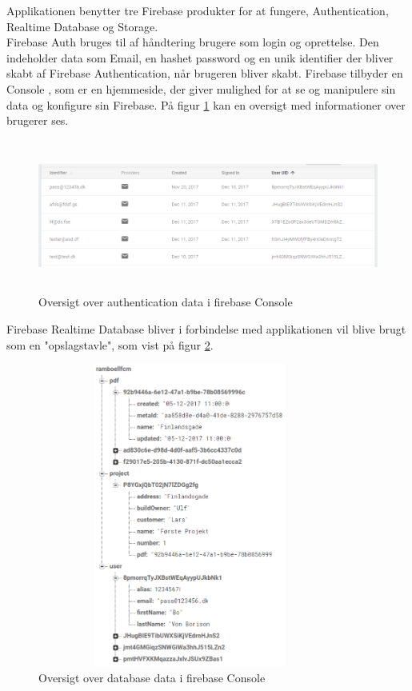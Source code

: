 Applikationen benytter tre Firebase produkter for at fungere, Authentication, Realtime Database og Storage.\\

 Firebase Auth\cite{FirebaseAuth} bruges til af håndtering brugere som login og oprettelse. Den indeholder data som Email, en hashet password og en unik identifier der bliver skabt af Firebase Authentication, når brugeren bliver skabt. Firebase tilbyder en Console , som er en hjemmeside, der giver mulighed for at se og manipulere sin data og konfigure sin Firebase. På figur \ref{fig:FirebaseAuthPNG} kan en oversigt med informationer over brugerer ses. 
\begin{figure}[H] %
	\centering
	\includegraphics[height=5cm, width=15cm]{../ArkitekturDesign/Design/Firebase/FirebaseAuth.PNG}
	\caption{Oversigt over authentication data i firebase Console}
	\label{fig:FirebaseAuthPNG}
\end{figure}

Firebase Realtime Database bliver i forbindelse med applikationen vil blive brugt som en "opslagstavle", som vist på figur \ref{fig:FirebaseDBPNG}.  
 
\begin{figure}[H] %
	\centering
	\includegraphics[height=10cm, width=10cm]{../ArkitekturDesign/Design/Firebase/FirebaseDB.PNG}
	\caption{Oversigt over database data i firebase Console}
	\label{fig:FirebaseDBPNG}
\end{figure}

